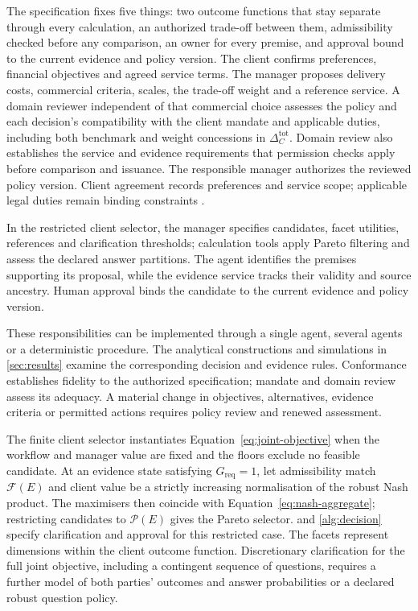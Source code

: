 \documentclass[oneside,10pt,english]{swissi}
\begin{document}
The specification fixes five things: two outcome functions that stay separate through every calculation, an authorized trade-off between them, admissibility checked before any comparison, an owner for every premise, and approval bound to the current evidence and policy version. The client confirms preferences, financial objectives and agreed service terms. The manager proposes delivery costs, commercial criteria, scales, the trade-off weight and a reference service. A domain reviewer independent of that commercial choice assesses the policy and each decision's compatibility with the client mandate and applicable duties, including both benchmark and weight concessions in $\Delta_C^{\mathrm{tot}}$. Domain review also establishes the service and evidence requirements that permission checks apply before comparison and issuance. The responsible manager authorizes the reviewed policy version. Client agreement records preferences and service scope; applicable legal duties remain binding constraints \parencite[paras.~1 and 10]{esma2026mifid24}.

In the restricted client selector, the manager specifies candidates, facet utilities, references and clarification thresholds; calculation tools apply Pareto filtering and assess the declared answer partitions. The agent identifies the premises supporting its proposal, while the evidence service tracks their validity and source ancestry. Human approval binds the candidate to the current evidence and policy version.

These responsibilities can be implemented through a single agent, several agents or a deterministic procedure. The analytical constructions and simulations in \cref{sec:results} examine the corresponding decision and evidence rules. Conformance establishes fidelity to the authorized specification; mandate and domain review assess its adequacy. A material change in objectives, alternatives, evidence criteria or permitted actions requires policy review and renewed assessment.

The finite client selector instantiates Equation~\eqref{eq:joint-objective} when the workflow and manager value are fixed and the floors exclude no feasible candidate. At an evidence state satisfying $G_{\mathrm{req}}=1$, let admissibility match $\mathcal F(E)$ and client value be a strictly increasing normalisation of the robust Nash product. The maximisers then coincide with Equation~\eqref{eq:nash-aggregate}; restricting candidates to $\mathcal P(E)$ gives the Pareto selector.  and \cref{alg:decision} specify clarification and approval for this restricted case. The facets represent dimensions within the client outcome function. Discretionary clarification for the full joint objective, including a contingent sequence of questions, requires a further model of both parties' outcomes and answer probabilities or a declared robust question policy.
\end{document}
